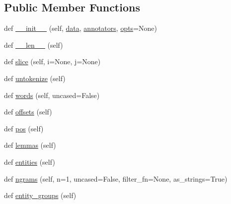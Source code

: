 \subsection*{Public Member Functions}
\begin{DoxyCompactItemize}
\item 
def \hyperlink{classparlai_1_1agents_1_1tfidf__retriever_1_1tokenizers_1_1tokenizer_1_1Tokens_a302d05e18dc97ba20cdfb879f3442b88}{\+\_\+\+\_\+init\+\_\+\+\_\+} (self, \hyperlink{classparlai_1_1agents_1_1tfidf__retriever_1_1tokenizers_1_1tokenizer_1_1Tokens_ad5068b92d72245d43fd75dbb4c070a27}{data}, \hyperlink{classparlai_1_1agents_1_1tfidf__retriever_1_1tokenizers_1_1tokenizer_1_1Tokens_a394834203475385444a933440dcdd026}{annotators}, \hyperlink{classparlai_1_1agents_1_1tfidf__retriever_1_1tokenizers_1_1tokenizer_1_1Tokens_ada7339fd7da0200a4260970771f9bfe9}{opts}=None)
\item 
def \hyperlink{classparlai_1_1agents_1_1tfidf__retriever_1_1tokenizers_1_1tokenizer_1_1Tokens_aa4d7fdac5660d51ef4b59712142c5ef4}{\+\_\+\+\_\+len\+\_\+\+\_\+} (self)
\item 
def \hyperlink{classparlai_1_1agents_1_1tfidf__retriever_1_1tokenizers_1_1tokenizer_1_1Tokens_a8e68a443796116164126c7216f5963d3}{slice} (self, i=None, j=None)
\item 
def \hyperlink{classparlai_1_1agents_1_1tfidf__retriever_1_1tokenizers_1_1tokenizer_1_1Tokens_a1bea40b1ea8e1772fb8ae6c2157ee819}{untokenize} (self)
\item 
def \hyperlink{classparlai_1_1agents_1_1tfidf__retriever_1_1tokenizers_1_1tokenizer_1_1Tokens_a81b6d47a051c87c7f885a6f7db5ac891}{words} (self, uncased=False)
\item 
def \hyperlink{classparlai_1_1agents_1_1tfidf__retriever_1_1tokenizers_1_1tokenizer_1_1Tokens_ad64d5292cef77a2a02193ba836875ba7}{offsets} (self)
\item 
def \hyperlink{classparlai_1_1agents_1_1tfidf__retriever_1_1tokenizers_1_1tokenizer_1_1Tokens_a5aa226b8190b5e72dbe0515caf0a21d6}{pos} (self)
\item 
def \hyperlink{classparlai_1_1agents_1_1tfidf__retriever_1_1tokenizers_1_1tokenizer_1_1Tokens_acc0353a15e5585dae3bd08943b9abe0c}{lemmas} (self)
\item 
def \hyperlink{classparlai_1_1agents_1_1tfidf__retriever_1_1tokenizers_1_1tokenizer_1_1Tokens_ab5d74ebfda5597b48f1ddc5f607292de}{entities} (self)
\item 
def \hyperlink{classparlai_1_1agents_1_1tfidf__retriever_1_1tokenizers_1_1tokenizer_1_1Tokens_ae66797d00194acc3c67b42c7cf17dabf}{ngrams} (self, n=1, uncased=False, filter\+\_\+fn=None, as\+\_\+strings=True)
\item 
def \hyperlink{classparlai_1_1agents_1_1tfidf__retriever_1_1tokenizers_1_1tokenizer_1_1Tokens_af76da989bcd6090398f0e63b8c30de22}{entity\+\_\+groups} (self)
\end{DoxyCompactItemize}
